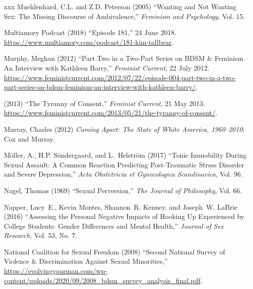 \documentclass[]{jlreq} \usepackage{mystyle}
\begin{document}
\begin{thebibliography}{xxx}
Muehlenhard, C.L. and Z.D. Peterson (2005) ``Wanting and Not Wanting Sex: The
  Missing Discourse of Ambivalence,'' \textit{ Feminism and Psychology}, Vol.
  15.

{Multiamory Podcast} (2018) ``Episode 181,'' 24 June 2018.
  \url{https://www.multiamory.com/podcast/181-kim-tallbear}.

Murphy, Meghan (2012) ``Part Two in a Two-Part Series on BDSM \& Feminism -- An
  Interview with Kathleen Barry,'' \emph{Feminist Current}, 22 July 2012.
  \url{https://www.feministcurrent.com/2012/07/22/episode-004-part-two-in-a-two-part-series-on-bdsm-feminism-an-interview-with-kathleen-barry/}.

 \bysame{}  (2013) ``The Tyranny of Consent,'' \emph{Feminist Current}, 21 May
  2013.
  \url{https://www.feministcurrent.com/2013/05/21/the-tyranny-of-consent/}.

Murray, Charles (2012)  \textit{ Coming Apart: The State of White America,
  1960--2010}: Cox and Murray.

Möller, A., H.P. Söndergaard, and L.~Helström (2017) ``Tonic Immobility
  During Sexual Assault: A Common Reaction Predicting Post-Traumatic Stress
  Disorder and Severe Depression,'' \textit{ Acta Obstetricia et Gynecologica
  Scandinavica}, Vol. 96.

Nagel, Thomas (1969) ``Sexual Perversion,'' \textit{ The Journal of
  Philosophy}, Vol. 66.

Napper, Lucy~E., Kevin Montes, Shannon~R. Kenney, and Joseph~W. LaBrie (2016)
  ``Assessing the Personal Negative Impacts of Hooking Up Experienced by
  College Students: Gender Differences and Mental Health,'' \textit{ Journal of
  Sex Research}, Vol. 53, No. 7.

{National Coalition for Sexual Freedom} (2008) ``Second National Survey of
  Violence \& Discrimination Against Sexual Minorities,''
  \url{https://evolvingyourman.com/wp-content/uploads/2020/09/2008_bdsm_survey_analysis_final.pdf}.


\end{thebibliography}
\end{document}
